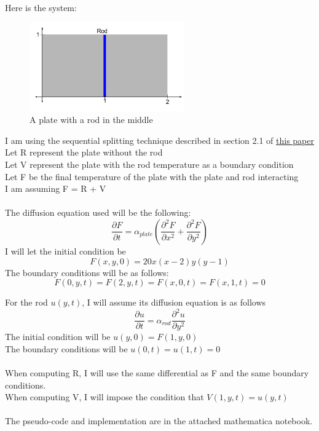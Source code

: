 \documentclass[twoside,11pt]{article}
\theoremstyle{definition}
\begin{document}
Here is the system:
\begin{figure}[h]
\centering
\includegraphics[height=1.5in]{PlateAndRod.png}
\caption{A plate with a rod in the middle}
\end{figure}

I am using the sequential splitting technique described in section 2.1 of \href{http://www.sciencedirect.com/science/article/pii/S0307904X07001606}{this paper}
\\
Let R represent the plate without the rod\\
Let V represent the plate with the rod temperature as a boundary condition\\
Let F be the final temperature of the plate with the plate and rod interacting\\
I am assuming F = R + V\\
\\
The diffusion equation used will be the following:
\[
\frac{\partial F}{\partial t} = \alpha_{plate} (\frac{\partial^2 F}{\partial x^2} + \frac{\partial^2 F}{\partial y^2})
\]
I will let the initial condition be 
\[
F(x,y,0)=20x(x-2)y(y-1)
\]
The boundary conditions will be as follows:
\[
F(0,y,t)=F(2,y,t)=F(x,0,t)=F(x,1,t)=0
\]

For the rod $u(y,t)$, I will assume its diffusion equation is as follows
\[
\frac{\partial u}{\partial t} = \alpha_{rod} \frac{\partial^2 u}{\partial y^2}
\]
The initial condition will be $u(y,0)=F(1,y,0)$\\
The boundary conditions will be $u(0,t)=u(1,t)=0$\\
\\
When computing R, I will use the same differential as F and the same boundary conditions. \\
When computing V, I will impose the condition that $V(1,y,t)=u(y,t)$\\
\\
The pseudo-code and implementation are in the attached mathematica notebook.
\end{document}
